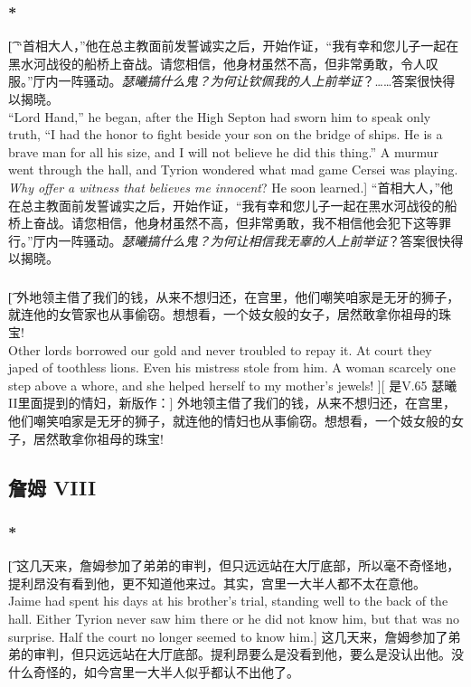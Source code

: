 \documentclass[12pt,a4paper]{article}
\begin{document}
\subsubsection{\color{red}*}\t[
	“首相大人，”他在总主教面前发誓诚实之后，开始作证，“我有幸和您儿子一起在黑水河战役的船桥上奋战。请您相信，他身材虽然不高，但非常勇敢，令人叹服。”厅内一阵骚动。\emph{瑟曦搞什么鬼？为何让钦佩我的人上前举证}？……答案很快得以揭晓。\\
	“Lord Hand,” he began, after the High Septon had sworn him to speak only truth, “I had the honor to fight beside your son on the bridge of ships. He is a brave man for all his size, and I will not believe he did this thing.” A murmur went through the hall, and Tyrion wondered what mad game Cersei was playing. \emph{Why offer a witness that believes me innocent}? He soon learned.]
	“首相大人，”他在总主教面前发誓诚实之后，开始作证，“我有幸和您儿子一起在黑水河战役的船桥上奋战。请您相信，他身材虽然不高，但非常勇敢，我不相信他会犯下这等罪行。”厅内一阵骚动。\emph{瑟曦搞什么鬼？为何让相信我无辜的人上前举证}？答案很快得以揭晓。
	
\subsubsection{}\t[
	外地领主借了我们的钱，从来不想归还，在宫里，他们嘲笑咱家是无牙的狮子，就连他的女管家也从事偷窃。想想看，一个妓女般的女子，居然敢拿你祖母的珠宝! \\
	Other lords borrowed our gold and never troubled to repay it. At court they japed of toothless lions. Even his mistress stole from him. A woman scarcely one step above a whore, and she helped herself to my mother's jewels! ][
	是V.65 瑟曦 II里面提到的情妇，新版作：]
	外地领主借了我们的钱，从来不想归还，在宫里，他们嘲笑咱家是无牙的狮子，就连他的情妇也从事偷窃。想想看，一个妓女般的女子，居然敢拿你祖母的珠宝! 
	
\subsection{詹姆 VIII}
\subsubsection{\color{red}*}\t[
	这几天来，詹姆参加了弟弟的审判，但只远远站在大厅底部，所以毫不奇怪地，提利昂没有看到他，更不知道他来过。其实，宫里一大半人都不太在意他。\\
	Jaime had spent his days at his brother's trial, standing well to the back of the hall. Either Tyrion never saw him there or he did not know him, but that was no surprise. Half the court no longer seemed to know him.]
	这几天来，詹姆参加了弟弟的审判，但只远远站在大厅底部。提利昂要么是没看到他，要么是没认出他。没什么奇怪的，如今宫里一大半人似乎都认不出他了。
	
\end{document}
